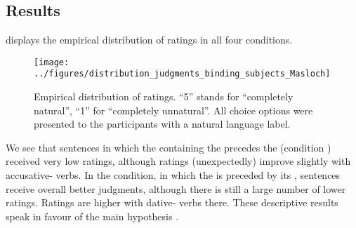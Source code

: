 \documentclass[output=paper,colorlinks,citecolor=brown]{langscibook}
\begin{document}
\subsection{Results}
\label{sec:results:Masloch}

 displays the empirical distribution of ratings in all four conditions.
\begin{figure}[t]
    \centering
    \texttt{[image: ../figures/distribution\_judgments\_binding\_subjects\_Masloch]}
    \caption{Empirical distribution of ratings. \enquote{5} stands for \enquote{completely natural}, \enquote{1} for \enquote{completely unnatural}. All choice options were presented to the participants with a natural language label.}
    \label{fig:emp_dist:Masloch}
\end{figure}
We see that sentences in which the  containing the  precedes the  (condition ) received very low ratings, although ratings (unexpectedly) improve slightly with accusative- verbs.
In the  condition, in which the  is preceded by its , sentences receive overall better judgments, although there is still a large number of lower ratings.
Ratings are higher with dative- verbs there.
These descriptive results speak in favour of the main hypothesis .
\end{document}
